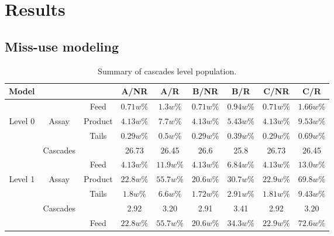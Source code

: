 \section{Results}

\subsection{Miss-use modeling}

\begin{table}[h!]
\centering
  \caption{Summary of cascades level population.}
\begin{tabular}{ccccccccc}
\toprule

Model       &        &           & A/NR      & A/R       & B/NR      & B/R      & C/NR       & C/R          \\
\midrule                                                                                                 
        &            & Feed      & $0.71w\%$ & $1.3w\%$  & $0.71w\%$ & $0.94w\%$ & $0.71w\%$ & $1.66w\%$ \\
Level 0 & Assay      & Product   & $4.13w\%$ & $7.7w\%$  & $4.13w\%$ & $5.43w\%$ & $4.13w\%$ & $9.53w\%$ \\
        &            & Tails      & $0.29w\%$ & $0.5w\%$  & $0.29w\%$ & $0.39w\%$ & $0.29w\%$ & $0.69w\%$  \\
        & Cascades   &           & 26.73     & 26.45     & 26.6      & 25.8      & 26.73     & 26.45      \\
\midrule                                                                                                 
        &            & Feed      & $4.13w\%$ & $11.9w\%$ & $4.13w\%$ & $6.84w\%$ & $4.13w\%$ & $13.0w\%$ \\
Level 1 & Assay      & Product   & $22.8w\%$ & $55.7w\%$ & $20.6w\%$ & $30.7w\%$ & $22.9w\%$ & $69.8w\%$ \\
        &            & Tails      & $1.8w\%$  & $6.6w\%$  & $1.72w\%$ & $2.91w\%$ & $1.81w\%$ & $9.43w\%$  \\
        & Cascades   &           & 2.92       & 3.20      & 2.91      & 3.41     & 2.92      & 3.20       \\
\midrule                                                                                                 
        &            & Feed      & $22.8w\%$ & $55.7w\%$ & $20.6w\%$ & $34.3w\%$ & $22.9w\%$ & $72.6w\%$ \\

\end{tabular}
\end{table}
